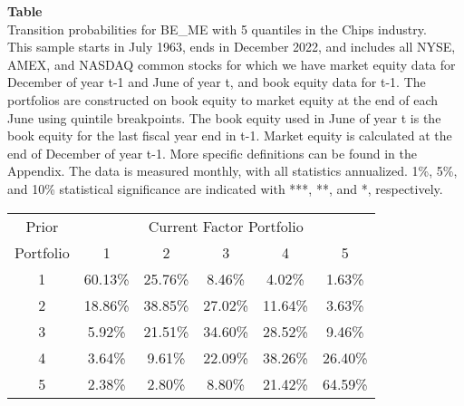 \begin{table*}[ht!]
\raggedright
{}
\label{tab: transition_probs_BE_ME_Chips_with_5_quantiles}
\textbf{Table \thetable} \\
Transition probabilities for BE_ME with 5 quantiles in the Chips industry. \\
\hspace*{1em}This sample starts in July 1963, ends in December 2022, and includes all NYSE, AMEX, and NASDAQ common stocks for which we have market equity data for December of year t-1 and June of year t, and book equity data for t-1. The portfolios are constructed on book equity to market equity at the end of each June using quintile breakpoints.  The book equity used in June of year t is the book equity for the last fiscal year end in t-1.  Market equity is calculated at the end of December of year t-1.  More specific definitions can be found in the Appendix.  The data is measured monthly, with all statistics annualized.  1\%, 5\%, and 10\% statistical significance are indicated with ***, **, and *, respectively. \\
\vspace{0.5em}
\centering
\begin{adjustbox}{max width=\textwidth}
\begin{tabular}{@{}cccccc@{}}
\toprule
Prior & \multicolumn{5}{c}{Current Factor Portfolio} \\
Portfolio & 1 & 2 & 3 & 4 & 5 \\
\midrule
1 & 60.13\% & 25.76\% & 8.46\% & 4.02\% & 1.63\% \\
2 & 18.86\% & 38.85\% & 27.02\% & 11.64\% & 3.63\% \\
3 & 5.92\% & 21.51\% & 34.60\% & 28.52\% & 9.46\% \\
4 & 3.64\% & 9.61\% & 22.09\% & 38.26\% & 26.40\% \\
5 & 2.38\% & 2.80\% & 8.80\% & 21.42\% & 64.59\% \\
\bottomrule
\end{tabular}
\end{adjustbox}
\end{table*}